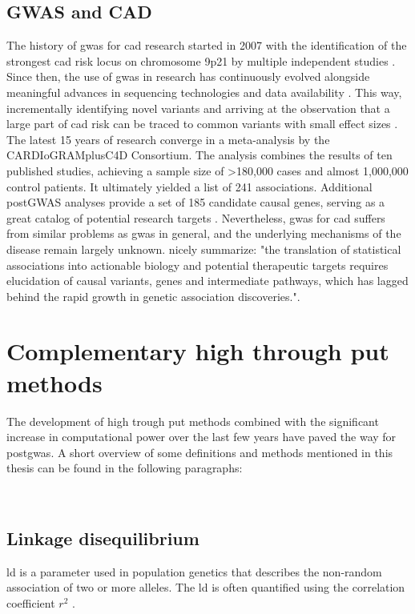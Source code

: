     \subsection{GWAS and CAD}
    \label{subsec:cad}

    The history of \ac{gwas} for \ac{cad} research started in 2007 with the identification of the strongest \ac{cad} risk locus on chromosome 9p21 by multiple independent studies \cite{holdtRecentStudiesHuman2012, erdmannDecadeGenomewideAssociation2018}. Since then, the use of \ac{gwas} in research has continuously evolved alongside meaningful advances in sequencing technologies and data availability \cite{erdmannDecadeGenomewideAssociation2018}. This way, incrementally identifying novel variants and arriving at the observation that a large part of \ac{cad} risk can be traced to common variants with small effect sizes \cite{kheraGeneticsCoronaryArtery2017, erdmannDecadeGenomewideAssociation2018}.\\
    The latest 15 years of research converge in a meta-analysis by the CARDIoGRAMplusC4D Consortium. The analysis combines the results of ten published studies, achieving a sample size of >180,000 cases and almost 1,000,000 control patients. It ultimately yielded a list of 241 associations. Additional postGWAS analyses provide a set of 185 candidate causal genes, serving as a great catalog of potential research targets \cite{aragamDiscoverySystematicCharacterization2021}. Nevertheless, \ac{gwas} for \ac{cad} suffers from similar problems as \ac{gwas} in general, and the underlying mechanisms of the disease remain largely unknown. \textcite{aragamDiscoverySystematicCharacterization2021} nicely summarize: "the translation of statistical associations into actionable biology and potential therapeutic targets requires elucidation of causal variants, genes and intermediate pathways, which has lagged behind the rapid growth in genetic association discoveries.".


    \section{Complementary high through put methods}
    \label{sec:bioinformatics}
    The development of high trough put methods combined with the significant increase in computational power over the last few years have paved the way for post\ac{gwas}. A short overview of some definitions and methods mentioned in this thesis can be found in the following paragraphs:

    \subsection{Linkage disequilibrium}
    \label{subsec:ld}
    \Ac{ld} is a parameter used in population genetics that describes the non-random association of two or more alleles. The \ac{ld} is often quantified using the correlation coefficient $r^2$ \cite{slatkinLinkageDisequilibriumUnderstanding2008}.

